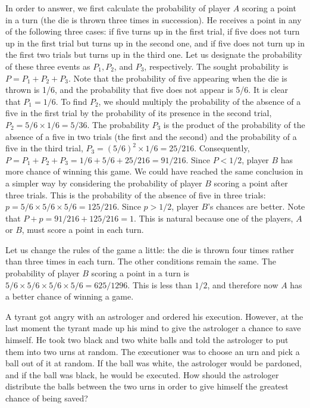In order to answer, we first calculate the probability of player
$A$ scoring a point in a turn (the die is thrown three times in succession).
He receives a point in any of the following three cases: if five turns up
in the first trial, if five does not turn up in the first trial but turns up in
the second one, and if five does not turn up in the first two trials but
turns up in the third one. Let us designate the probability of these three
events as $P_{1},  P_{2}$, and $P_{3}$, respectively. The sought probability is $P =
P_{1} + P_{2} + P_{3}$. Note that the probability of five appearing when the die
is thrown is {1/6}, and the probability that five does not appear is {5/6}. It
is clear that $P_{1} = 1/6$. To find $P_{2}$, we should multiply the probability of
the absence of a five in the first trial by the probability of its presence in
the second trial, $P_{2} = 5/6 \times 1/6 = 5/36$. The probability $P_{3}$ is the
product of the probability of the absence of a five in two trials (the first
and the second) and the probability of a five in the third trial, $P_{3}=
(5/6)^{2} \times 1/6 = 25/216$.  Consequently, $ P = P_{1} + P_{2} + P_{3} = 1/6 +
5/6 + 25/216 = 91/216$. Since $P < 1/2$, player $B$ has more chance of
winning this game. We could have reached the same conclusion in
a simpler way by considering the probability of player $B$ scoring a point
after three trials. This is the probability of the absence of five in three
trials: $p = 5/6 \times 5/6 \times 5/6 = 125/216$. Since $p> 1/2$, player $B$'s chances
are better. Note that $P+p=91/216+125/216=1$. This is natural
because one of the players, $A$ or $B$, must score a point in each turn.

Let us change the rules of the game a little: the die is thrown four
times rather than three times in each turn. The other conditions remain
the same. The probability of player $B$ scoring a point in a turn is
$5/6 \times  5/6 \times 5/6 \times 5/6 =625/1296$. This is less than $1/2$, and therefore now $A$ has a better chance of winning a game.



 A tyrant got angry with an astrologer
and ordered his execution. However, at the last moment the tyrant made
up his mind to give the astrologer a chance to save himself. He took
two black and two white balls and told the astrologer to put them into
two urns at random. The executioner was to choose an urn and pick
a ball out of it at random. If the ball was white, the astrologer would be
pardoned, and if the ball was black, he would be executed. How should
the astrologer distribute the balls between the two urns in order to give
himself the greatest chance of being saved?

